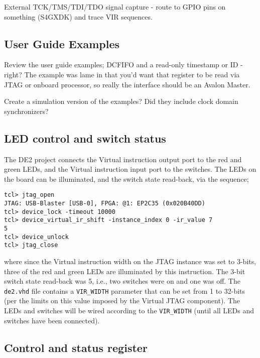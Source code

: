 \documentclass[10pt,twoside]{article}
\begin{document}
External TCK/TMS/TDI/TDO signal capture - route to GPIO pins
on something (S4GXDK) and trace VIR sequences.


\subsection{User Guide Examples}

Review the user guide examples; DCFIFO and a read-only timestamp 
or ID - right? The example was lame in that you'd want that
register to be read via JTAG or onboard processor, so really
the interface should be an Avalon Master.

Create a simulation version of the examples? Did they include
clock domain synchronizers?

\subsection{LED control and switch status}

The DE2 project connects the Virtual instruction output port to
the red and green LEDs, and the Virtual instruction
input port to the switches. The LEDs on the board can be
illuminated, and the switch state read-back, via the sequence;
%
\begin{verbatim}
tcl> jtag_open
JTAG: USB-Blaster [USB-0], FPGA: @1: EP2C35 (0x020B40DD)
tcl> device_lock -timeout 10000
tcl> device_virtual_ir_shift -instance_index 0 -ir_value 7
5
tcl> device_unlock
tcl> jtag_close
\end{verbatim}
%
where since the Virtual instruction width on the JTAG instance
was set to 3-bits, three of the red and green LEDs are illuminated
by this instruction. The 3-bit switch state read-back was
5, i.e., two switches were on and one was off. The \verb+de2.vhd+
file contains a \verb+VIR_WIDTH+ parameter that can be set from
1 to 32-bits (per the limits on this value imposed by the
Virtual JTAG component). The LEDs and switches will be wired
according to the \verb+VIR_WIDTH+ (until all LEDs and switches
have been connected).

\subsection{Control and status register}
\end{document}
